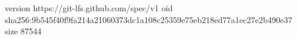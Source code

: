 version https://git-lfs.github.com/spec/v1
oid sha256:9b545f40f9fa214a21060373dc1a108c25359e75eb218ed77a1ec27e2b490e37
size 87544
